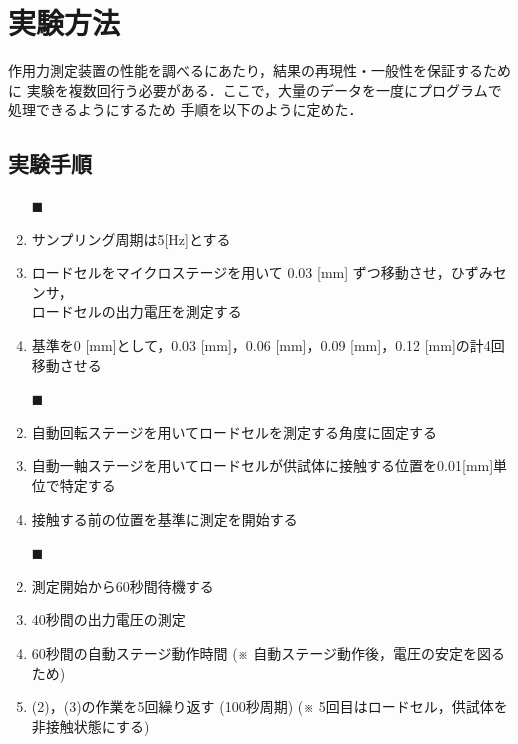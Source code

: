 \documentclass[twocolumn,a4j]{jsarticle}
\begin{document}
\newpage

\section{実験方法}
作用力測定装置の性能を調べるにあたり，結果の再現性・一般性を保証するために
実験を複数回行う必要がある．ここで，大量のデータを一度にプログラムで処理できるようにするため
手順を以下のように定めた．\\

\subsection{実験手順}

\begin{enumerate}[(1)]
    \item [$\blacksquare$]  
    \item サンプリング周期は5[Hz]とする
    \item ロードセルをマイクロステージを用いて 0.03 [mm] ずつ移動させ，ひずみセンサ，\\
          ロードセルの出力電圧を測定する
    \item 基準を0 [mm]として，0.03 [mm]，0.06 [mm]，0.09 [mm]，0.12 [mm]の計4回移動させる
\end{enumerate}

\begin{enumerate}[(1)]
    \item [$\blacksquare$]  
    \item 自動回転ステージを用いてロードセルを測定する角度に固定する
    \item 自動一軸ステージを用いてロードセルが供試体に接触する位置を0.01[mm]単位で特定する
    \item 接触する前の位置を基準に測定を開始する
\end{enumerate}

\begin{enumerate}[(1)]
    \item [$\blacksquare$]  
    \item 測定開始から60秒間待機する
    \item 40秒間の出力電圧の測定
    \item 60秒間の自動ステージ動作時間 (※ 自動ステージ動作後，電圧の安定を図るため)
    \item (2)，(3)の作業を5回繰り返す (100秒周期) (※ 5回目はロードセル，供試体を非接触状態にする)
\end{enumerate}
\end{document}
